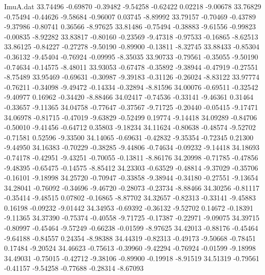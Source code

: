 \begin{filecontents}{ImuA.dat}
  33.74496   -0.69870   -0.39482   -9.54258   -0.62422    0.02218   -9.00678
  33.76829   -0.75494   -0.44626   -9.58684   -0.96007    0.03745   -8.89992
  33.79157   -0.70469   -0.43789   -9.37986   -0.80741    0.36566   -8.97625
  33.81486   -0.75494   -0.38883   -9.61556   -0.99823   -0.00835   -8.92282
  33.83817   -0.80160   -0.23569   -9.47318   -0.97533   -0.16865   -8.62513
  33.86125   -0.84227   -0.27278   -9.50190   -0.89900   -0.13811   -8.32745
  33.88433   -0.85304   -0.36132   -9.45404   -0.76924   -0.09995   -8.35035
  33.90733   -0.79561   -0.35055   -9.50190   -0.74634   -0.14575   -8.48011
  33.93053   -0.67478   -0.35892   -9.38944   -0.47919   -0.27551   -8.75489
  33.95469   -0.69631   -0.30987   -9.39183   -0.31126   -0.26024   -8.83122
  33.97774   -0.76211   -0.34098   -9.49472   -0.14334   -0.32894   -8.81596
  34.00076   -0.69511   -0.32542   -9.40977    0.16962   -0.34420   -8.88466
  34.02417   -0.74536   -0.33141   -9.46361    0.31464   -0.33657   -9.11365
  34.04758   -0.77647   -0.37567   -9.71725   -0.20440   -0.05415   -9.17471
  34.06978   -0.81715   -0.47019   -9.63829   -0.52499    0.19774   -9.14418
  34.09289   -0.84706   -0.50010   -9.41456   -0.64712    0.35803   -9.18234
  34.11624   -0.80638   -0.48574   -9.52702   -0.71581    0.52596   -9.33500
  34.14065   -0.69631   -0.42832   -9.35354   -0.72345    0.21300   -9.44950
  34.16383   -0.70229   -0.38285   -9.44806   -0.74634   -0.09232   -9.14418
  34.18693   -0.74178   -0.42951   -9.43251   -0.70055   -0.13811   -8.86176
  34.20998   -0.71785   -0.47856   -9.48395   -0.65475   -0.14575   -8.85412
  34.23303   -0.63529   -0.48814   -9.37029   -0.35706   -0.16101   -9.18998
  34.25720   -0.70947   -0.33858   -9.38944   -0.34180   -0.27551   -9.13654
  34.28041   -0.76092   -0.34696   -9.46720   -0.28073   -0.23734   -8.88466
  34.30256   -0.81117   -0.35414   -9.48515    0.07802   -0.16865   -8.87702
  34.32657   -0.82313   -0.33141   -9.45883    0.16198   -0.09232   -9.01442
  34.34953   -0.69392   -0.36132   -9.52702    0.14672   -0.18391   -9.11365
  34.37390   -0.75374   -0.40558   -9.71725   -0.17387   -0.22971   -9.09075
  34.39715   -0.80997   -0.45464   -9.57249   -0.66238   -0.01599   -8.97625
  34.42013   -0.88176   -0.45464   -9.64188   -0.84557    0.24354   -8.98388
  34.44319   -0.82313   -0.49173   -9.50668   -0.78451    0.17484   -9.20524
  34.46623   -0.75613   -0.39960   -9.42294   -0.76924   -0.01599   -9.18998
  34.49031   -0.75015   -0.42712   -9.38106   -0.89900   -0.19918   -8.91519
  34.51319   -0.79561   -0.41157   -9.54258   -0.77688   -0.28314   -8.67093

\end{filecontents}
